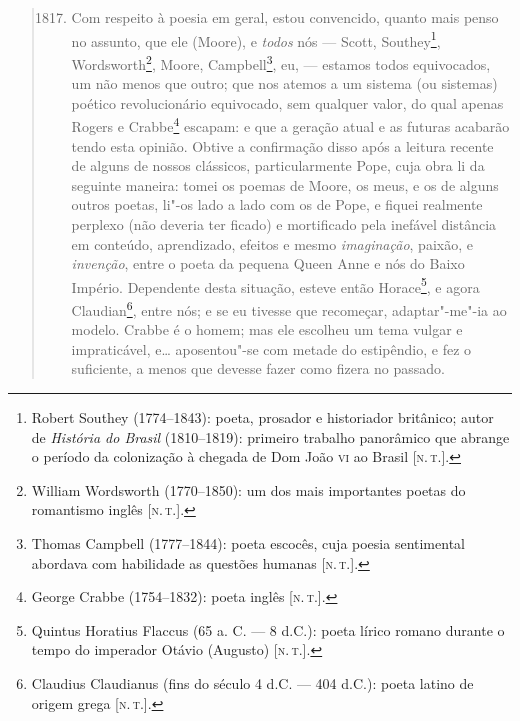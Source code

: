 \begin{quote} %
\begin{enumerate}[label=(\arabic*)]
  \setcounter{enumi}{1816}
\item\mbox{} Com respeito à poesia em geral, estou convencido, quanto mais
penso no assunto, que ele (Moore), e \emph{todos} nós --- Scott,
Southey\footnote{Robert Southey (1774--1843): poeta, prosador e
  historiador britânico; autor de \emph{História do Brasil}
  (1810--1819): primeiro trabalho panorâmico que abrange o
  período da colonização à chegada de Dom João \textsc{vi} ao Brasil {[}\textsc{n.\,t.}{]}.}, Wordsworth\footnote{William Wordsworth (1770--1850): um dos
  mais importantes poetas do romantismo inglês {[}\textsc{n.\,t.}{]}.}, Moore,
Campbell\footnote{Thomas Campbell (1777--1844): poeta escocês, cuja
  poesia sentimental abordava com habilidade as questões humanas {[}\textsc{n.\,t.}{]}.}, eu, --- estamos todos equivocados, um não menos que outro;
que nos atemos a um sistema (ou sistemas) poético revolucionário
equivocado, sem qualquer valor, do qual apenas Rogers e Crabbe\footnote{George
  Crabbe (1754--1832): poeta inglês {[}\textsc{n.\,t.}{]}.} escapam: e que a
geração atual e as futuras acabarão tendo esta opinião. Obtive a
confirmação disso após a leitura recente de alguns de nossos clássicos,
particularmente Pope, cuja obra li da seguinte maneira: tomei os poemas
de Moore, os meus, e os de alguns outros poetas, li"-os lado a lado com
os de Pope, e fiquei realmente perplexo (não deveria ter ficado) e
mortificado pela inefável distância em conteúdo, aprendizado, efeitos e
mesmo \emph{imaginação}, paixão, e \emph{invenção}, entre o poeta da
pequena Queen Anne e nós do Baixo Império. Dependente desta situação,
esteve então Horace\footnote{Quintus Horatius Flaccus (65 a. C. --- 8
  d.C.): poeta lírico romano durante o tempo do imperador Otávio
  (Augusto) {[}\textsc{n.\,t.}{]}.}, e agora Claudian\footnote{Claudius
  Claudianus (fins do século 4 d.C. --- 404 d.C.): poeta latino de origem
  grega {[}\textsc{n.\,t.}{]}.}, entre nós; e se eu tivesse que recomeçar,
adaptar"-me"-ia ao modelo. Crabbe é o homem; mas ele escolheu um tema
vulgar e impraticável, e\ldots{} aposentou"-se com metade do estipêndio, e fez
o suficiente, a menos que devesse fazer como fizera no passado.


\end{enumerate}
\end{quote}
